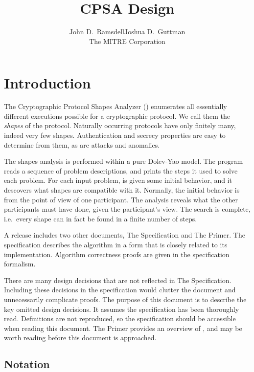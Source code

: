 \documentclass[12pt]{report}
\title{CPSA Design}
\author{John D.~Ramsdell\qquad Joshua D.~Guttman\\ The MITRE Corporation}
\theoremstyle{definition}
\begin{document}
\maketitle
\cpsacopying

\tableofcontents

\chapter{Introduction}

The Cryptographic Protocol Shapes Analyzer ({\cpsa}) enumerates all
essentially different executions possible for a cryptographic
protocol.  We call them the \emph{shapes} of the protocol.  Naturally
occurring protocols have only finitely many, indeed very few shapes.
Authentication and secrecy properties are easy to determine from them,
as are attacks and anomalies.

The shapes analysis is performed within a pure Dolev-Yao model.  The
{\cpsa} program reads a sequence of problem descriptions, and prints
the steps it used to solve each problem.  For each input problem,
{\cpsa} is given some initial behavior, and it descovers what shapes
are compatible with it.  Normally, the initial behavior is from the
point of view of one participant.  The analysis reveals what the other
participants must have done, given the participant's view.  The search
is complete, i.e.\ every shape can in fact be found in a finite
number of steps.

A {\cpsa} release includes two other documents, The {\cpsa}
Specification and The {\cpsa} Primer.  The specification describes the
{\cpsa} algorithm in a form that is closely related to its
implementation.  Algorithm correctness proofs are given in the
specification formalism.

There are many design decisions that are not reflected in The {\cpsa}
Specification.  Including these decisions in the specification would
clutter the document and unnecessarily complicate proofs.  The purpose
of this document is to describe the key omitted design decisions.  It
assumes the specification has been thoroughly read.  Definitions are
not reproduced, so the specification should be accessible when reading
this document.  The {\cpsa} Primer provides an overview of {\cpsa},
and may be worth reading before this document is approached.

\section{Notation}\label{sec:notation}
\end{document}
